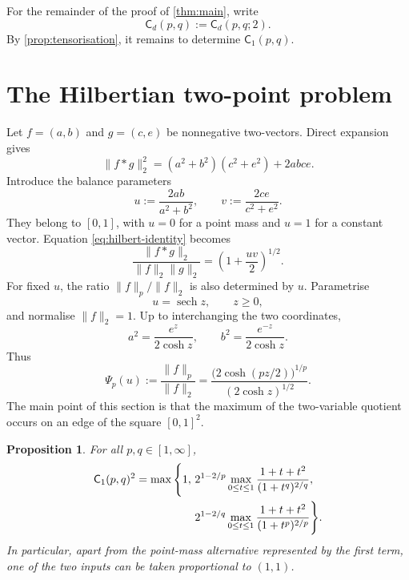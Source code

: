 \documentclass[11pt,reqno]{amsart}
\numberwithin{equation}{section}
\newtheorem{proposition}[proposition]{Proposition}
\theoremstyle{definition}
\theoremstyle{remark}
\newcommand{\Cpqr}{\mathsf C}
\begin{document}
For the remainder of the proof of \cref{thm:main}, write
\[
  \Cpqr_d(p,q):=\Cpqr_d(p,q;2).
\]
By \cref{prop:tensorisation}, it remains to determine $\Cpqr_1(p,q)$.

\section{The Hilbertian two-point problem}\label{sec:boundary-reduction}

Let $f=(a,b)$ and $g=(c,e)$ be nonnegative two-vectors.  Direct expansion gives
\begin{equation}\label{eq:hilbert-identity}
  \|f*g\|_2^2
  =(a^2+b^2)(c^2+e^2)+2abce.
\end{equation}
Introduce the balance parameters
\begin{equation}\label{eq:balance-parameters}
  u:=\frac{2ab}{a^2+b^2},
  \qquad
  v:=\frac{2ce}{c^2+e^2}.
\end{equation}
They belong to $[0,1]$, with $u=0$ for a point mass and $u=1$ for a constant vector.  Equation \eqref{eq:hilbert-identity} becomes
\begin{equation}\label{eq:numerator-balance}
  \frac{\|f*g\|_2}{\|f\|_2\|g\|_2}
  =\left(1+\frac{uv}{2}\right)^{1/2}.
\end{equation}
For fixed $u$, the ratio $\|f\|_p/\|f\|_2$ is also determined by $u$.  Parametrise
\begin{equation}\label{eq:hyperbolic-param}
  u=\operatorname{sech}z,
  \qquad z\ge0,
\end{equation}
and normalise $\|f\|_2=1$.  Up to interchanging the two coordinates,
\[
  a^2=\frac{e^z}{2\cosh z},
  \qquad
  b^2=\frac{e^{-z}}{2\cosh z}.
\]
Thus
\begin{equation}\label{eq:Psi-def}
  \Psi_p(u)
  :=\frac{\|f\|_p}{\|f\|_2}
  =\frac{\bigl(2\cosh(pz/2)\bigr)^{1/p}}
  {(2\cosh z)^{1/2}}.
\end{equation}
The main point of this section is that the maximum of the two-variable quotient occurs on an edge of the square $[0,1]^2$.

\begin{proposition}\label{prop:edge-reduction}
For all $p,q\in[1,\infty]$,
\begin{align}\label{eq:C1-edge}
  \Cpqr_1(p,q)^2
  =\max\Bigg\{1,
  &\ 2^{1-2/p}
  \max_{0\le t\le1}
  \frac{1+t+t^2}{(1+t^q)^{2/q}},\notag\\
  &\ 2^{1-2/q}
  \max_{0\le t\le1}
  \frac{1+t+t^2}{(1+t^p)^{2/p}}
  \Bigg\}.
\end{align}
In particular, apart from the point-mass alternative represented by the first term, one of the two inputs can be taken proportional to $(1,1)$.
\end{proposition}
\end{document}
